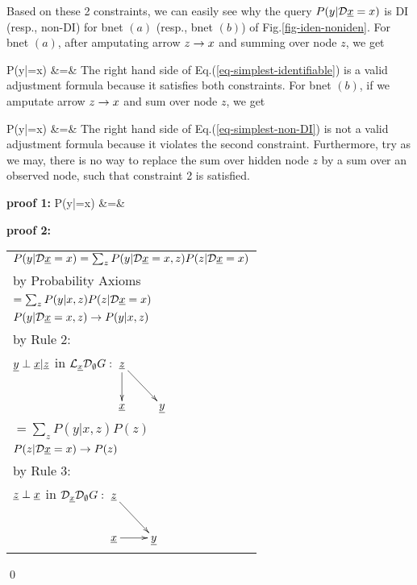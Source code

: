 Based on these 2 constraints,
we can easily see why the
query $P(y|\cald\rvx=x)$
is DI (resp., non-DI)
for bnet $(a)$ (resp., bnet $(b)$)
of Fig.\ref{fig-iden-noniden}.
For bnet $(a)$, after amputating arrow
$z\rightarrow x$ and summing over node $z$,
we get

\beqa
P(y|\cald\rvx=x)
&=&
\label{eq-simplest-identifiable}
\eeqa
The right hand
side of Eq.(\ref{eq-simplest-identifiable})
is a valid
adjustment formula
because it satisfies both constraints.
For bnet $(b)$,
if we amputate arrow
$z\rightarrow x$
and sum over node $z$,
we get

\beqa
P(y|\cald \rvx =x)
&=&
\label{eq-simplest-non-DI}
\eeqa
The right hand
side of Eq.(\ref{eq-simplest-non-DI})
is not a valid
adjustment formula
because it violates the
second constraint. Furthermore,
try as we may,  there
is no way to replace the sum over
hidden  node $z$ by a sum over an observed node,
such that
constraint 2 is satisfied.





\begin{claim}
\label{cl-decBackDoor}
\decBackDoor
\end{claim}

\proof

{\bf * proof 1:}
\beqa
P(y|\cald\rvx=x)
&=&
\eeqa


{\bf * proof 2:}
\begin{longtable}{l}
\color{red}
$P(y|\cald\rvx=x)
=
\sum_z
P(y|\cald\rvx=x, z)
P(z|\cald\rvx=x)$
\\
\quad by Probability Axioms
\\
\color{red}
$=\sum_z
P(y|x, z)
P(z|\cald\rvx=x)$
\\
\quad $P(y|\cald \rvx=x, z)\rarrow
P(y|x, z)$
\\
\quad  by Rule 2:
\\
\quad
$\rvy\perp\rvx|\rvz$ in
$\call_\rvx\cald_\emptyset G:
\xymatrix{
\rvz\ar[d]\ar[rd]
\\
\rvx
&\rvy
}$
\\
\color{red}
$=\sum_z
P(y|x, z)
P(z)$
\\
\quad $P(z|\cald \rvx=x)\rarrow
P(z)$
\\
\quad  by Rule 3:
\\
\quad
$\rvz\perp \rvx$ in
$\cald_\rvx \cald_\emptyset G:
\xymatrix{
\rvz\ar[rd]
\\
\rvx\ar[r]
&\rvy
}
$
\end{longtable}
\qed





